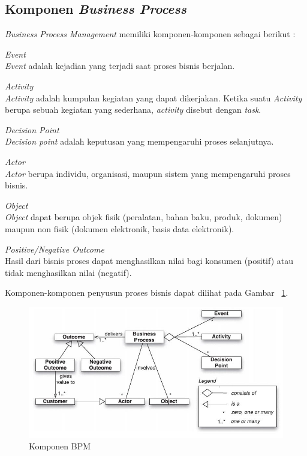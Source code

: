 \subsection{Komponen \textit{Business Process}}
\label{sec:komponenBP}
\textit{Business Process Management} memiliki komponen-komponen sebagai berikut :
\begin{description}
	\item{\textit{Event}} \hfill \\\textit{Event} adalah kejadian yang terjadi saat proses bisnis berjalan. 
	\item{\textit{Activity}} \hfill \\\textit{Activity} adalah kumpulan kegiatan yang dapat dikerjakan. Ketika suatu \textit{Activity} berupa sebuah kegiatan yang sederhana, \textit{activity} disebut dengan \textit{task}. 
	\item{\textit{Decision Point}} \hfill \\\textit{Decision point} adalah keputusan yang mempengaruhi proses selanjutnya.
	\item{\textit{Actor}} \hfill \\ \textit{Actor} berupa individu, organisasi, maupun sistem yang mempengaruhi proses bisnis. 
	\item{\textit{Object}} \hfill \\ \textit{Object} dapat berupa objek fisik (peralatan, bahan baku, produk, dokumen) maupun non fisik (dokumen elektronik, basis data elektronik).
	\item{\textit{Positive/Negative Outcome}} \hfill \\ Hasil dari bisnis proses dapat menghasilkan nilai bagi konsumen (positif) atau tidak menghasilkan nilai (negatif).
\end{description}
Komponen-komponen penyusun proses bisnis dapat dilihat pada Gambar ~\ref{komponenbp}.
\begin{figure}[H]
	\centering
	\includegraphics[scale=0.7]{Gambar/Bab-2/1-bp-components}
	\caption{Komponen BPM} 
	\label{komponenbp}
\end{figure}





